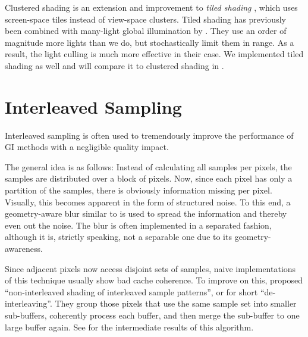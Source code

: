 Clustered shading is an extension and improvement to \textit{tiled shading} \citep{Olsson:2011:TiledShading}, which uses screen-space tiles instead of view-space clusters. Tiled shading has previously been combined with many-light global illumination by \citet{Tokuyoshi:2016:Stochastic}. They use an order of magnitude more lights than we do, but stochastically limit them in range. As a result, the light culling is much more effective in their case.
We implemented tiled shading as well and will compare it to clustered shading in .


\section{Interleaved Sampling}
\label{sec:concept:interleavedSampling}
Interleaved sampling \citep{Keller:2001:InterleavedSampling} is often used to tremendously improve the performance of GI methods with a negligible quality impact.

The general idea is as follows: Instead of calculating all samples per pixels, the samples are distributed over a block of pixels. Now, since each pixel has only a partition of the samples, there is obviously information missing per pixel. Visually, this becomes apparent in the form of structured noise. To this end, a geometry-aware blur similar to \citet{laine2007incremental} is used to spread the information and thereby even out the noise. The blur is often implemented in a separated fashion, although it is, strictly speaking, not a separable one due to its geometry-awareness.

Since adjacent pixels now access disjoint sets of samples, naive implementations of this technique usually show bad cache coherence. To improve on this, \citet{segovia2006non} proposed ``non-interleaved shading of interleaved sample patterns'', or for short ``de-interleaving''. They group those pixels that use the same sample set into smaller sub-buffers, coherently process each buffer, and then merge the sub-buffer to one large buffer again. See  for the intermediate results of this algorithm.



